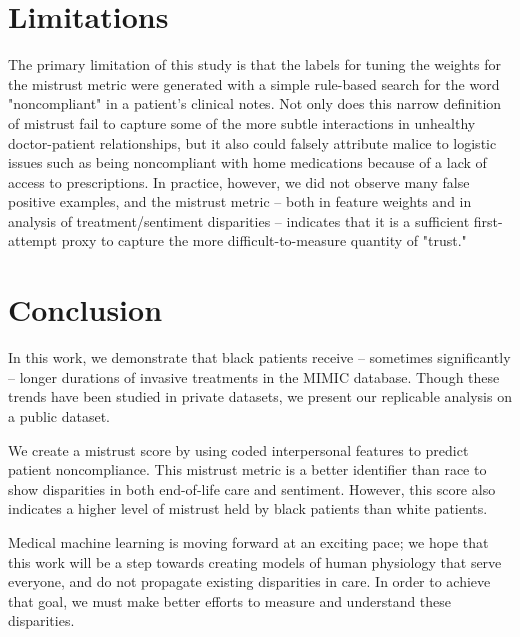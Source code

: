 \documentclass{article}
\begin{document}
\section{Limitations}
The primary limitation of this study is that the labels for tuning the weights for the mistrust metric were generated with a simple rule-based search for the word "noncompliant" in a patient's clinical notes. Not only does this narrow definition of mistrust fail to capture some of the more subtle interactions in unhealthy doctor-patient relationships, but it also could falsely attribute malice to logistic issues such as being noncompliant with home medications because of a lack of access to prescriptions. In practice, however, we did not observe many false positive examples, and the mistrust metric -- both in feature weights and in analysis of treatment/sentiment disparities -- indicates that it is a sufficient first-attempt proxy to capture the more difficult-to-measure quantity of "trust."



\section{Conclusion}
In this work, we demonstrate that black patients receive -- sometimes significantly -- longer durations of invasive treatments in the MIMIC database. Though these trends have been studied in private datasets, we present our replicable analysis on a public dataset.

We create a mistrust score by using coded interpersonal features to predict patient noncompliance. 
This mistrust metric is a better identifier than race to show
disparities in both end-of-life care and sentiment.
However, this score also indicates a higher level of mistrust held by black patients than white patients.

Medical machine learning is moving forward at an exciting pace; we hope that this work will be a step towards creating models of human physiology that serve everyone, and do not propagate existing disparities in care. In order to achieve that goal, we must make better efforts to measure and understand these disparities.






\end{document}

